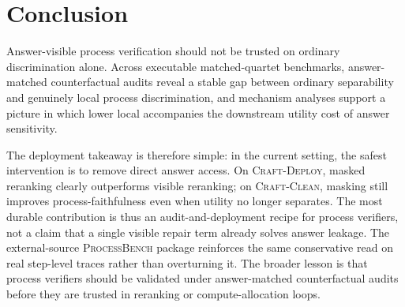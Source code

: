 \section{Conclusion}

Answer-visible process verification should not be trusted on ordinary
discrimination alone. Across executable matched-quartet benchmarks,
answer-matched counterfactual audits reveal a stable gap between ordinary
separability and genuinely local process discrimination, and mechanism analyses
support a picture in which lower local \amcd{} accompanies the downstream
utility cost of answer sensitivity.

The deployment takeaway is therefore simple: in the current setting,
the safest intervention is to remove direct answer access. On
\textsc{Craft-Deploy}, masked reranking clearly outperforms visible reranking;
on \textsc{Craft-Clean}, masking still improves process-faithfulness even when
utility no longer separates. The most durable contribution is thus an
audit-and-deployment recipe for process verifiers, not a claim that a single
visible repair term already solves answer leakage. The external-source
\textsc{ProcessBench} package reinforces the same conservative read on real
step-level traces rather than overturning it. The broader lesson is that
process verifiers should be validated under answer-matched counterfactual
audits before they are trusted in reranking or compute-allocation loops.

